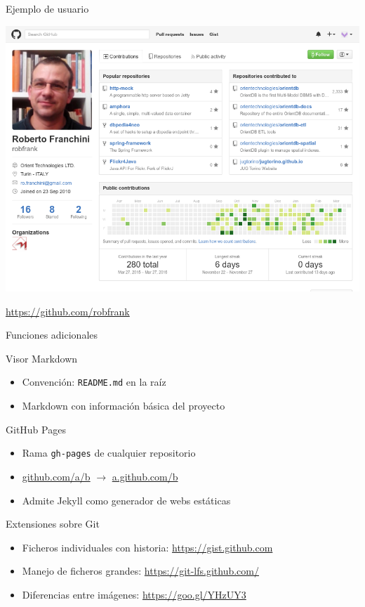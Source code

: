 \documentclass[xcolor=svgnames]{beamer}
\begin{document}
\begin{frame}{Ejemplo de usuario}
  \begin{center}
    \includegraphics[width=.9\textwidth,height=.8\textheight,keepaspectratio]{orientdb-user}

    \url{https://github.com/robfrank}
  \end{center}
\end{frame}

\begin{frame}{Funciones adicionales}
  \begin{block}{Visor Markdown}
    \begin{itemize}
    \item Convención: \texttt{README.md} en la raíz
    \item Markdown con información básica del proyecto
    \end{itemize}
  \end{block}

  \begin{block}{GitHub Pages}
    \begin{itemize}
    \item Rama \texttt{gh-pages} de cualquier repositorio
    \item \url{github.com/a/b} $\rightarrow$ \url{a.github.com/b}
    \item Admite Jekyll como generador de webs estáticas
    \end{itemize}
  \end{block}

  \begin{block}{Extensiones sobre Git}
    \begin{itemize}
    \item Ficheros individuales con historia: \url{https://gist.github.com}
    \item Manejo de ficheros grandes: \url{https://git-lfs.github.com/}
    \item Diferencias entre imágenes: \url{https://goo.gl/YHzUY3}
    \end{itemize}
  \end{block}
\end{frame}
\end{document}
